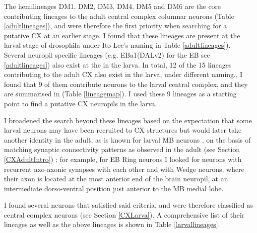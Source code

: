     The hemilineages DM1, DM2, DM3, DM4, DM5 and DM6 are the core contributing lineages to the adult central complex columnar neurons (Table \ref{adultlineages}), and were therefore the first priority when searching for a putative CX at an earlier stage. I found that these lineages are present at the larval stage of drosophila under Ito Lee's naming in Table \ref{adultlineages}).  Several neuropil specific lineages (e.g. EBa1(DALv2) for the EB see \ref{adultlineages}) also exist at the in the larva. In total, 12 of the 15 lineages contributing to the adult CX also exist in the larva, under different naming., I found that 9 of them contribute neurons to the larval central complex, and they are summarised in (Table \ref{lineagemap}).  I used these 9 lineages as a starting point to find a putative CX neuropils in the larva.

    I broadened the search beyond these lineages based on the expectation that some larval neurons may have been recruited to CX structures but would later take another identity in the adult, as is known for larval MB neurons \citep{truman2023metamorphosis}, on the basis of matching synaptic connectivity patterns as observed in the adult (see Section \ref{CXAdultIntro}) ; for example, for EB Ring neurons I looked for neurons with recurrent axo-axonic synapses with each other and with Wedge neurons, where their axon is located at the most anterior end of the brain neuropil, at an intermediate dorso-ventral position just anterior to the MB medial lobe.

    I found several neurons that satisfied said criteria, and were therefore classified as central complex neurons (see Section \ref{CXLarva}). A comprehensive list of their lineages as well as the above lineages is shown in Table \ref{larvallineages}. 
    

